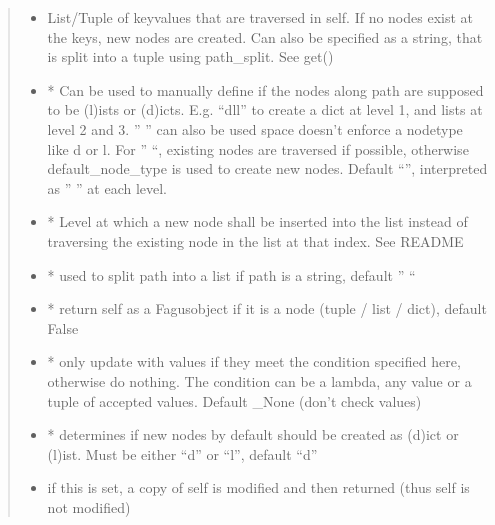 \documentclass[a4paper,10pt,english]{sphinxmanual}
\begin{document}
\begin{fulllineitems}
\begin{fulllineitems}
\begin{quote}
\begin{description}
\begin{itemize}
\item {}
\sphinxAtStartPar
{} \textendash{} List/Tuple of key\sphinxhyphen{}values that are traversed in self. If no nodes exist at the keys, new nodes are
created. Can also be specified as a string, that is split into a tuple using path\_split. See get()

\item {}
\sphinxAtStartPar
{} \textendash{} * Can be used to manually define if the nodes along path are supposed to be (l)ists or
(d)icts. E.g. “dll” to create a dict at level 1, and lists at level 2 and 3. ” ” can also be used \sphinxhyphen{}
space doesn’t enforce a node\sphinxhyphen{}type like d or l. For ” “, existing nodes are traversed if possible,
otherwise default\_node\_type is used to create new nodes. Default “”, interpreted as ” ” at each level.

\item {}
\sphinxAtStartPar
{} \textendash{} * Level at which a new node shall be inserted into the list instead of traversing the
existing node in the list at that index. See README

\item {}
\sphinxAtStartPar
{} \textendash{} * used to split path into a list if path is a string, default ” “

\item {}
\sphinxAtStartPar
{} \textendash{} * return self as a Fagus\sphinxhyphen{}object if it is a node (tuple / list / dict), default False

\item {}
\sphinxAtStartPar
{} \textendash{} * only update with values if they meet the condition specified here, otherwise do nothing. The
condition can be a lambda, any value or a tuple of accepted values. Default \_None (don’t check values)

\item {}
\sphinxAtStartPar
{} \textendash{} * determines if new nodes by default should be created as (d)ict or (l)ist. Must be
either “d” or “l”, default “d”

\item {}
\sphinxAtStartPar
{} \textendash{} if this is set, a copy of self is modified and then returned (thus self is not modified)


\end{itemize}
\end{description}
\end{quote}
\end{fulllineitems}
\end{fulllineitems}
\end{document}
